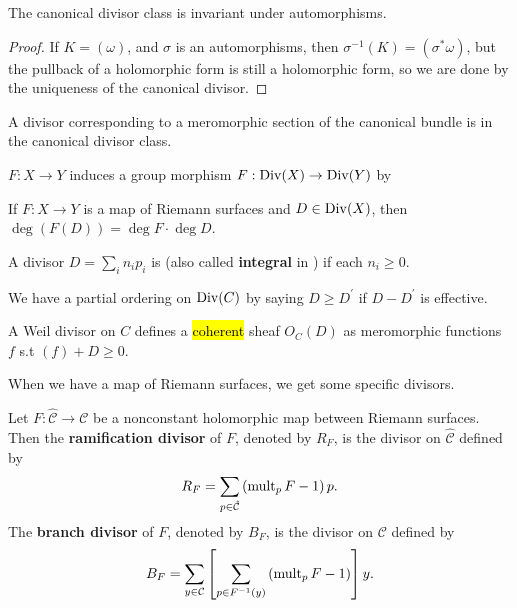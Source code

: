 \documentclass{article}
\begin{document}
\begin{prop}
	The canonical divisor class is invariant under automorphisms.
\end{prop}
\begin{proof}
	If $K = (\omega)$, and $\sigma$ is an automorphisms, then $\sigma^{-1}(K) = (\sigma^\ast \omega)$, but the pullback of a holomorphic form is still a holomorphic form, so we are done by the uniqueness of the canonical divisor. 
\end{proof}

\begin{prop}
	A divisor corresponding to a meromorphic section of the canonical bundle is in the canonical divisor class. 
\end{prop}

\begin{lemma}
	$F:X \to Y$ induces a group morphism $F:\operatorname{Div}(X) \to \operatorname{Div}(Y)$ by 
\end{lemma}

\begin{prop}
	If $F:X \to Y$ is a map of Riemann surfaces and $D \in \operatorname{Div}(X)$, then $\deg(F(D)) = \deg F \cdot \deg D$.
\end{prop}

\begin{definition}
	A divisor $D = \sum_i n_i p_i$ is  (also called \textbf{integral} in \cite{Farkas1992}) if each $n_i \geq0$.  
\end{definition}

\begin{prop}
	We have a partial ordering on $\operatorname{Div}(C)$ by saying $D\geq D^\prime$ if $D-D^\prime$ is effective. 
\end{prop}

\begin{definition}
	A Weil divisor on $C$ defines a \hl{coherent} sheaf $O_C(D)$ as meromorphic functions $f$ s.t $(f)+D\geq0$. 
\end{definition}

When we have a map of Riemann surfaces, we get some specific divisors. 
\begin{definition}
Let $F:\hat{\mathcal{C}}\rightarrow\mathcal{C}$ be a nonconstant
holomorphic map between Riemann surfaces. Then the
\textbf{ramification divisor} of $F$, denoted by $R_F$, is the
divisor on $\hat{\mathcal{C}}$ defined by
\begin{equation}
R_F=\sum_{p\in \hat{\mathcal{C}}}\left(\operatorname{mult}_p F-1\right)p.
\end{equation}
The \textbf{branch divisor} of $F$, denoted by $B_F$, is the
divisor on ${\mathcal{C}}$ defined by
\begin{equation}
B_F=\sum_{y\in {\mathcal{C}}}\left[\sum_{p\in F\sp{-1}(y)}\left(\operatorname{mult}_p F-1\right)\right]y.
\end{equation}
\end{definition}	
\end{document}

